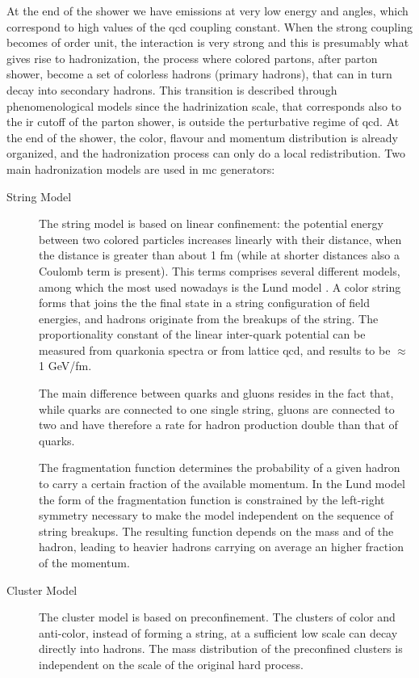 At the end of the shower we have emissions at very low energy and angles, which correspond to high values of the \gls{qcd} coupling constant. 
When the strong coupling becomes of order unit, the interaction is very strong and this is presumably what gives rise to hadronization, the process where colored partons, after parton shower, become a set of colorless hadrons (primary hadrons), 
that can in turn decay into secondary hadrons. This transition is described through phenomenological models since the hadrinization scale, that corresponds also to the \gls{ir} cutoff of the parton shower, is outside the perturbative regime of \gls{qcd}. At the end of the shower, the color, flavour and momentum distribution is already organized, and the hadronization process can only do a local redistribution.
Two main hadronization models are used in \gls{mc} generators:

\begin{description}
\item[String Model] The string model \cite{Artru:1974hr} is based on linear confinement: the potential energy between two colored particles increases linearly with their distance, when the distance is greater than about 1 fm (while at shorter distances also a Coulomb term is present). This terms comprises several different models, among which the most used nowadays is the Lund model \cite{Andersson:1983ia,Andersson:1998tv}. 
A color string forms that joins the the final state in a string configuration of field energies, and hadrons originate from the breakups of the string. The proportionality constant of the linear inter-quark potential can be measured from quarkonia spectra or from lattice \gls{qcd}, and results to be $\approx$ 1 GeV/fm.

The main difference between quarks and gluons resides in the fact that, while quarks are connected to one single string, gluons are connected to two and have therefore a rate for hadron production double than that of quarks. 


The fragmentation function determines the probability of a given hadron to carry a certain fraction of the available momentum. In the Lund model the form of the fragmentation function is constrained by the left-right symmetry necessary to make the model independent on the sequence of string breakups. The resulting function depends on the mass and \pt of the hadron, leading to heavier hadrons carrying on average an higher fraction of the momentum.

\item[Cluster Model] The cluster model is based on preconfinement. The clusters of color and anti-color, instead of forming a string, at a sufficient low scale can decay directly into hadrons. The mass distribution of the preconfined clusters is independent on the scale of the original hard process.


\end{description}



